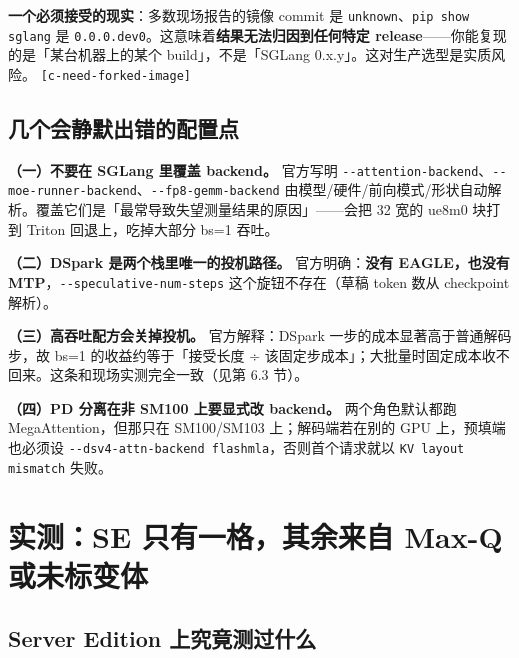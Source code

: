 \textbf{一个必须接受的现实}：多数现场报告的镜像 commit 是 \texttt{unknown}、\texttt{pip\allowbreak{} show\allowbreak{} sglang} 是 \texttt{0.0.0.dev0}。这意味着\textbf{结果无法归因到任何特定 release}——你能复现的是「某台机器上的某个 build」，不是「SGLang 0.x.y」。这对生产选型是实质风险。 {\scriptsize\texttt{[c-\hspace{0pt}need-\hspace{0pt}forked-\hspace{0pt}image]}}


\subsection{几个会静默出错的配置点}

\textbf{（一）不要在 SGLang 里覆盖 backend。} 官方写明 \texttt{-\allowbreak{}-\allowbreak{}attention-\allowbreak{}backend}、\texttt{-\allowbreak{}-\allowbreak{}moe-\allowbreak{}runner-\allowbreak{}backend}、\texttt{-\allowbreak{}-\allowbreak{}fp8-\allowbreak{}gemm-\allowbreak{}backend} 由模型/硬件/前向模式/形状自动解析。覆盖它们是「最常导致失望测量结果的原因」——会把 32 宽的 ue8m0 块打到 Triton 回退上，吃掉大部分 bs=1 吞吐。


\textbf{（二）DSpark 是两个栈里唯一的投机路径。} 官方明确：\textbf{没有 EAGLE，也没有 MTP}，\texttt{-\allowbreak{}-\allowbreak{}speculative-\allowbreak{}num-\allowbreak{}steps} 这个旋钮不存在（草稿 token 数从 checkpoint 解析）。


\textbf{（三）高吞吐配方会关掉投机。} 官方解释：DSpark 一步的成本显著高于普通解码步，故 bs=1 的收益约等于「接受长度 ÷ 该固定步成本」；大批量时固定成本收不回来。这条和现场实测完全一致（见第 6.3 节）。


\textbf{（四）PD 分离在非 SM100 上要显式改 backend。} 两个角色默认都跑 MegaAttention，但那只在 SM100/SM103 上；解码端若在别的 GPU 上，预填端也必须设 \texttt{-\allowbreak{}-\allowbreak{}dsv4-\allowbreak{}attn-\allowbreak{}backend\allowbreak{} flashmla}，否则首个请求就以 \texttt{KV\allowbreak{} layout\allowbreak{} mismatch} 失败。



\section{实测：SE 只有一格，其余来自 Max-Q 或未标变体}

\subsection{Server Edition 上究竟测过什么}

